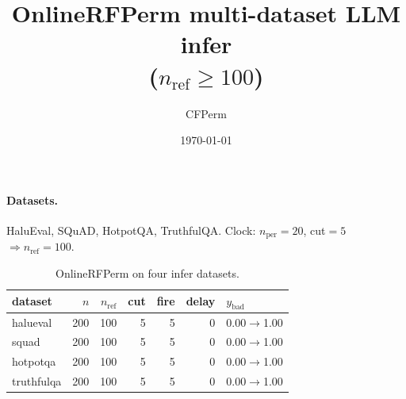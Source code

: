 \documentclass[11pt]{article}
\title{OnlineRFPerm multi-dataset LLM infer\\($n_{\mathrm{ref}}\ge 100$)}
\author{CFPerm}
\date{\today}
\begin{document}
\maketitle
\paragraph{Datasets.}
HaluEval, SQuAD, HotpotQA, TruthfulQA. Clock: $n_{\mathrm{per}}=20$, cut$=5$ $\Rightarrow n_{\mathrm{ref}}=100$.
\begin{table}[h]\centering
\caption{OnlineRFPerm on four infer datasets.}
\begin{tabular}{lrrrrrl}
\toprule dataset & $n$ & $n_{\mathrm{ref}}$ & cut & fire & delay & $y_{\mathrm{bad}}$ \\
\midrule
halueval & 200 & 100 & 5 & 5 & 0 & 0.00$\to$1.00 \\
squad & 200 & 100 & 5 & 5 & 0 & 0.00$\to$1.00 \\
hotpotqa & 200 & 100 & 5 & 5 & 0 & 0.00$\to$1.00 \\
truthfulqa & 200 & 100 & 5 & 5 & 0 & 0.00$\to$1.00 \\
\bottomrule\end{tabular}\end{table}
\end{document}

